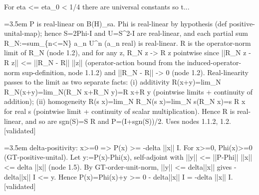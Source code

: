 \documentclass{article}
\newcommand{\step}[1]{\par\noindent\hangindent=3.5em\hangafter=1%
  \makebox[3.5em][l]{\textbf{#1.}}}
\newcommand{\steptag}[1]{\hfill{\small\textsf{[#1]}}}
\begin{document}
\begin{proofbox}{For eta <= eta\_0 < 1/4 there are universal constants so t...}
\step{1.6} P is real-linear on B(H)\_sa. Phi is real-linear by hypothesis (def positive-unital-map); hence S=2Phi-I and U=S\textasciicircum{}2-I are real-linear, and each partial sum R\_N:=sum\_\{n<=N\} a\_n U\textasciicircum{}n (a\_n real) is real-linear. R is the operator-norm limit of R\_N (node 1.2), and for any z, R\_N z -> R z pointwise since ||R\_N z - R z|| <= ||R\_N - R|| ||z|| (operator-action bound from the induced-operator-norm sup-definition, node 1.1.2) and ||R\_N - R|| -> 0 (node 1.2). Real-linearity passes to the limit as two separate facts: (i) additivity R(x+y)=lim\_N R\_N(x+y)=lim\_N(R\_N x+R\_N y)=R x+R y (pointwise limits + continuity of addition); (ii) homogeneity R(s x)=lim\_N R\_N(s x)=lim\_N s(R\_N x)=s R x for real s (pointwise limit + continuity of scalar multiplication). Hence R is real-linear, and so are sgn(S)=S R and P=(I+sgn(S))/2. Uses nodes 1.1.2, 1.2. \steptag{validated} \\[4pt]
\step{1.7} delta-positivity: x>=0 => P(x) >= -delta ||x|| I. For x>=0, Phi(x)>=0 (GT-positive-unital). Let y:=P(x)-Phi(x), self-adjoint with ||y|| <= ||P-Phi|| ||x|| <= delta ||x|| (node 1.5). By GT-order-unit-norm, ||y|| <= delta||x|| gives -delta||x|| I <= y. Hence P(x)=Phi(x)+y >= 0 - delta||x|| I = -delta ||x|| I. \steptag{validated} \\[4pt]
\end{proofbox}
\end{document}
